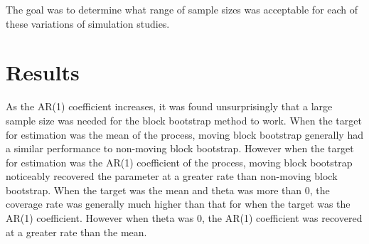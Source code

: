 \documentclass[12pt, letterpaper, titlepage]{article}
\begin{document}
The goal was to determine what range of sample sizes was acceptable for each of these variations of simulation studies.



 

\section{Results}
\label{sec:results}

As the AR(1) coefficient increases, it was found unsurprisingly that a large sample size was needed for the block bootstrap method to work. When the target for estimation was the mean of the process, moving block bootstrap generally had a similar performance to non-moving block bootstrap. However when the target for estimation was the AR(1) coefficient of the process, moving block bootstrap noticeably recovered the parameter at a greater rate than non-moving block bootstrap. When the target was the mean and theta was more than 0, the coverage rate was generally much higher than that for when the target was the AR(1) coefficient. However when theta was 0, the AR(1) coefficient was recovered at a greater rate than the mean. 
\end{document}
